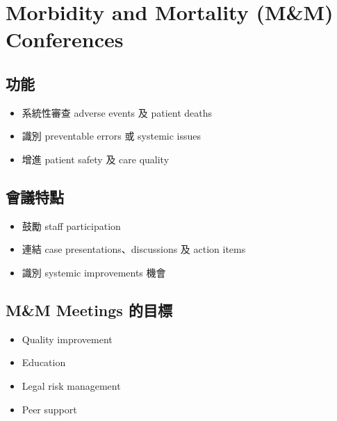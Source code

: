 \documentclass[12pt,a4paper]{article}
\begin{document}
\section{Morbidity and Mortality (M\&M) Conferences}

\subsection{功能}

\begin{itemize}
    \item 系統性審查 adverse events 及 patient deaths
    \item 識別 preventable errors 或 systemic issues
    \item 增進 patient safety 及 care quality
\end{itemize}

\subsection{會議特點}

\begin{itemize}
    \item 鼓勵 staff participation
    \item 連結 case presentations、discussions 及 action items
    \item 識別 systemic improvements 機會
\end{itemize}

\subsection{M\&M Meetings 的目標}

\begin{itemize}
    \item Quality improvement
    \item Education
    \item Legal risk management
    \item Peer support
\end{itemize}


\end{document}
